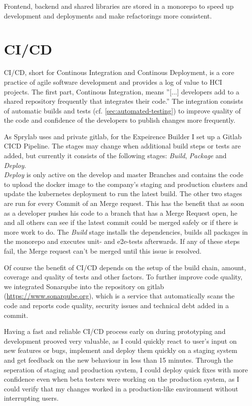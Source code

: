 Frontend, backend and shared libraries are stored in a monorepo to speed up development and deployments and make refactorings more consistent.

\section{CI/CD}

CI/CD, short for Continous Integration and Continous Deployment, is a core practice of agile software development and provides a log of value to
HCI projects. The first part, Continous Integration, means ''[...] developers add to a shared repository frequently that integrates their code.'' \cite[p. 81]{LearnHCI:2020ys}
The integration consists of automatic builds and tests (cf. \ref*{sec:automated-testing}) to improve quality of the code and confidence of the developers to publish changes more frequently.

As Sprylab uses and private gitlab, for the Expeirence Builder I set up a Gitlab CICD Pipeline. The stages may change when additional build steps or tests are added, but currently it consists of the following stages: \textit{Build}, \textit{Package} and \textit{Deploy}.
\\
\textit{Deploy} is only active on the develop and master Branches and contains the code to upload the docker image to the company's staging and production clusters and update the kubernetes deployment to run the latest build.
The other two stages are run for every Commit of an Merge request. This has the benefit that as soon as a developer pushes his code to a branch that has a Merge Request open,
he and all others can see if the latest commit could be merged safely or if there is more work to do.
The \textit{Build} stage installs the dependencies, builds all packages in the monorepo and executes unit- and e2e-tests afterwards. If any of these steps fail, the Merge request can't be merged until this issue is resolved.

Of course the benefit of CI/CD depends on the setup of the build chain, amount, coverage and quality of tests and other factors. To further improve code quality, we integrated Sonarqube into the repository on gitlab (\url{https://www.sonarqube.org}),
which is a service that automatically scans the code and reports code quality, security issues and technical debt added in a commit.

Having a fast and reliable CI/CD process early on during prototyping and development prooved very valuable, as I could quickly react to user's input on new features or bugs, implement and deploy them quickly on a staging system and get feedback
on the new behaviour in less than 15 minutes. Through the seperation of staging and production system, I could deploy quick fixes with more confidence even when beta testers were working on the production system, as I could verify that my changes
worked in a production-like environment without interrupting users.

